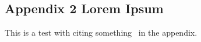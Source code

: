 
%

\begin{newpdflayout}{297mm}{420mm}

\chapter{Appendix 2 Lorem Ipsum}
\label{app:lorem_ipsum2}

This is a test with citing something~\cite{ecoop12-dias} in the appendix.

\lipsum[1-5]

\end{newpdflayout}
